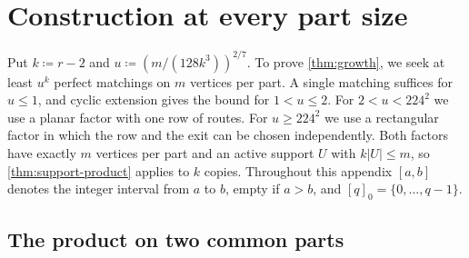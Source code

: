 \documentclass[10pt]{article}
\numberwithin{equation}{section}
\theoremstyle{definition}
\begin{document}
\appendix

\section{Construction at every part size}\label{app:construction}

Put $k\coloneqq r-2$ and $u\coloneqq(m/(128k^3))^{2/7}$. To prove \cref{thm:growth}, we seek at least $u^k$ perfect matchings on $m$ vertices per part. A single matching suffices for $u\le1$, and cyclic extension gives the bound for $1<u\le2$. For $2<u<224^2$ we use a planar factor with one row of routes. For $u\ge224^2$ we use a rectangular factor in which the row and the exit can be chosen independently. Both factors have exactly $m$ vertices per part and an active support $U$ with $k|U|\le m$, so \cref{thm:support-product} applies to $k$ copies. Throughout this appendix $[a,b]$ denotes the integer interval from $a$ to $b$, empty if $a>b$, and $[q]_0=\{0,\ldots,q-1\}$.

\subsection{The product on two common parts}
\end{document}
